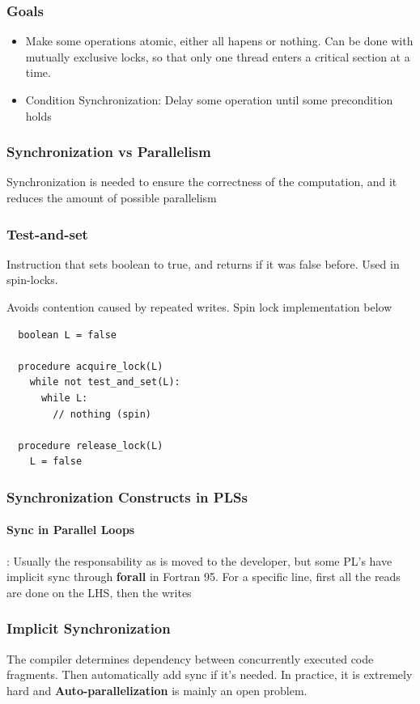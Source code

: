 \documentclass{article}
\begin{document}
\subsubsection{Goals}
\begin{itemize}
  \item Make some operations atomic, either all hapens or nothing. Can be done with mutually exclusive locks, so that only one thread enters a critical section at a time.
  \item Condition Synchronization: Delay some operation until some precondition holds
\end{itemize}
\subsubsection{Synchronization vs Parallelism}
Synchronization is needed to ensure the correctness of the computation, and it reduces the amount of possible parallelism

\subsubsection{Test-and-set}
Instruction that sets boolean to true, and returns if it was false before. Used in spin-locks.

Avoids contention caused by repeated writes. Spin lock implementation below
\begin{lstlisting}
  boolean L = false

  procedure acquire_lock(L) 
    while not test_and_set(L):
      while L:
        // nothing (spin)
  
  procedure release_lock(L)
    L = false
\end{lstlisting}

\subsubsection{Synchronization Constructs in PLSs}
\paragraph{Sync in Parallel Loops}: Usually the responsability as is moved to the developer, but some PL's have implicit sync through \textbf{forall} in Fortran 95. For a specific line, first all the reads are done on the LHS, then the writes

\subsubsection{Implicit Synchronization}
The compiler determines dependency between concurrently executed code fragments. Then automatically add sync if it's needed. In practice, it is extremely hard and \textbf{Auto-parallelization} is mainly an open problem.
\end{document}

